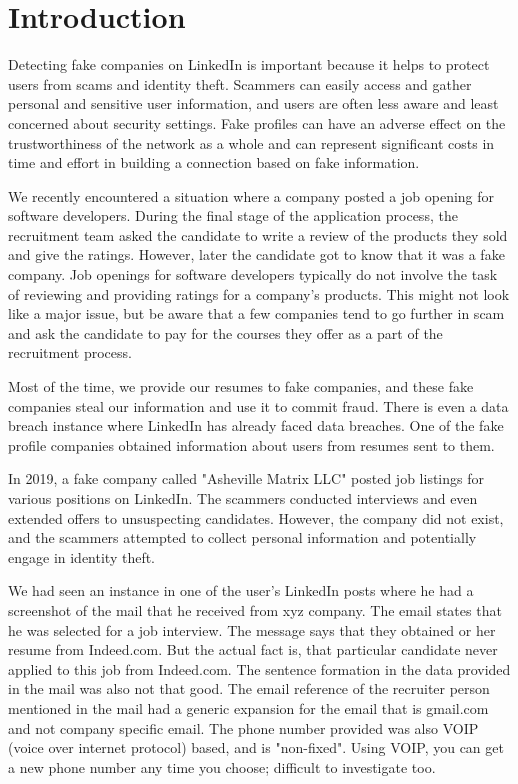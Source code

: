 \documentclass{article}
\begin{document}
\section{Introduction}
Detecting fake companies on LinkedIn is important because it helps to protect users from scams and identity theft. Scammers can easily access and gather personal and sensitive user information, and users are often less aware and least concerned about security settings. Fake profiles can have an adverse effect on the trustworthiness of the network as a whole and can represent significant costs in time and effort in building a connection based on fake information.

We recently encountered a situation where a company posted a job opening for software developers. During the final stage of the application process, the recruitment team asked the candidate to write a review of the products they sold and give the ratings. However, later the candidate got to know that it was a fake company. Job openings for software developers typically do not involve the task of reviewing and providing ratings for a company's products.
This might not look like a major issue, but be aware that a few companies tend to go further in scam and ask the candidate to pay for the courses they offer as a part of the recruitment process.

Most of the time, we provide our resumes to fake companies, and these fake companies steal our information and use it to commit fraud. 
There is even a data breach instance where LinkedIn has already faced data breaches. One of the fake profile companies obtained information about users from resumes sent to them. 

In 2019, a fake company called "Asheville Matrix LLC" posted job listings for various positions on LinkedIn. The scammers conducted interviews and even extended offers to unsuspecting candidates. However, the company did not exist, and the scammers attempted to collect personal information and potentially engage in identity theft.

We had seen an instance in one of the user’s LinkedIn posts where he had a screenshot of the mail that he received from xyz company. The email states that he was selected for a job interview. The message says that they obtained or her resume from Indeed.com. But the actual fact is, that particular candidate never applied to this job from Indeed.com. The sentence formation in the data provided in the mail was also not that good.  The email reference of the recruiter person mentioned in the mail had a generic expansion for the email that is gmail.com and not company specific email.  The phone number provided was also VOIP (voice over internet protocol) based, and is "non-fixed". Using VOIP, you can get a new phone number any time you choose; difficult to investigate too.
\end{document}
